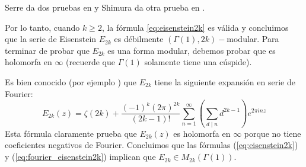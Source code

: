  %

\begin{nota}
  Serre da dos pruebas en \cite[\S VII.2.2]{SerreACIA} y Shimura da otra prueba en
  \cite[\S III.8]{ShimuraMFBAB}.
\end{nota}

Por lo tanto, cuando $k\geq 2$, la f\'ormula \eqref{eq:eisenstein2k} es v\'alida y concluimos que
la serie de Eisenstein $E_{2k}$ es d\'ebilmente $(\Gamma(1),2k)-$modular. Para terminar de probar
que $E_{2k}$ es una forma modular, debemos probar que es holomorfa en $\infty$ (recuerde que
$\Gamma(1)$ solamente tiene una c\'uspide).

Es bien conocido (por ejemplo \cite[\S1.3, pg. 28]{BumpAFAR}) que $E_{2k}$ tiene la siguiente
expansi\'on en serie de Fourier:
\begin{equation}\label{eq:fourier_eisenstein2k}
  E_{2k}(z)=
  \zeta(2k)+\frac{(-1)^k(2\pi)^{2k}}{(2k-1)!}\sum_{n=1}^{\infty}\left(\sum_{d\mid n}d^{2k-1}\right)
  e^{2\pi inz}
\end{equation}
Esta f\'ormula claramente prueba que $E_{2k}(z)$ es holomorfa en $\infty$ porque no tiene
coeficientes negativos de Fourier. Concluimos que las f\'ormulas (\ref{eq:eisenstein2k}) y
(\ref{eq:fourier_eisenstein2k}) implican que $E_{2k}\in M_{2k}(\Gamma(1))$.

